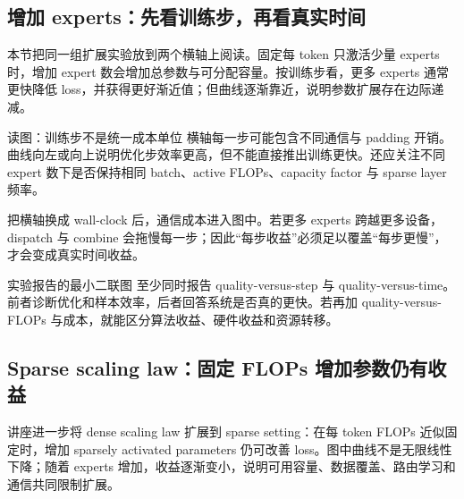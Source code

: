 \subsection{增加 experts：先看训练步，再看真实时间}

本节把同一组扩展实验放到两个横轴上阅读。固定每 token 只激活少量 experts 时，增加 expert 数会增加总参数与可分配容量。按训练步看，更多 experts 通常更快降低 loss，并获得更好渐近值；但曲线逐渐靠近，说明参数扩展存在边际递减。


\begin{knowledgebox}{读图：训练步不是统一成本单位}
横轴每一步可能包含不同通信与 padding 开销。曲线向左或向上说明优化步效率更高，但不能直接推出训练更快。还应关注不同 expert 数下是否保持相同 batch、active FLOPs、capacity factor 与 sparse layer 频率。
\end{knowledgebox}

把横轴换成 wall-clock 后，通信成本进入图中。若更多 experts 跨越更多设备，dispatch 与 combine 会拖慢每一步；因此“每步收益”必须足以覆盖“每步更慢”，才会变成真实时间收益。


\begin{importantbox}{实验报告的最小二联图}
至少同时报告 quality-versus-step 与 quality-versus-time。前者诊断优化和样本效率，后者回答系统是否真的更快。若再加 quality-versus-FLOPs 与成本，就能区分算法收益、硬件收益和资源转移。
\end{importantbox}

\subsection{Sparse scaling law：固定 FLOPs 增加参数仍有收益}

讲座进一步将 dense scaling law 扩展到 sparse setting：在每 token FLOPs 近似固定时，增加 sparsely activated parameters 仍可改善 loss。图中曲线不是无限线性下降；随着 experts 增加，收益逐渐变小，说明可用容量、数据覆盖、路由学习和通信共同限制扩展。


